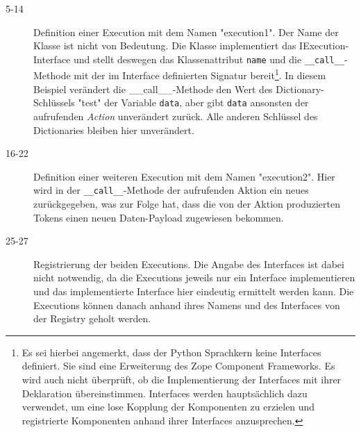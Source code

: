 \begin{description}
\item[5-14] Definition einer Execution mit dem Namen "execution1". Der Name der Klasse ist nicht von Bedeutung. Die Klasse implementiert das IExecution-Interface und stellt deswegen das Klassenattribut \texttt{name} und die \texttt{\_\_call\_\_}-Methode mit der im Interface definierten Signatur bereit\footnote{Es sei hierbei angemerkt, dass der Python Sprachkern keine Interfaces definiert. Sie sind eine Erweiterung des Zope Component Frameworks. Es wird auch nicht überprüft, ob die Implementierung der Interfaces mit ihrer Deklaration übereinstimmen. Interfaces werden hauptsächlich dazu verwendet, um eine lose Kopplung der Komponenten zu erzielen und registrierte Komponenten anhand ihrer Interfaces anzusprechen.}. In diesem Beispiel verändert die {\_\_call\_\_}-Methode den Wert des Dictionary-Schlüssels "test" der Variable \texttt{data}, aber gibt \texttt{data} ansonsten der aufrufenden \emph{Action} unverändert zurück. Alle anderen Schlüssel des Dictionaries bleiben hier unverändert.
\item[16-22] Definition einer weiteren Execution mit dem Namen "execution2". Hier wird in der \texttt{\_\_call\_\_}-Methode der aufrufenden Aktion ein neues  zurückgegeben, was zur Folge hat, dass die von der Aktion produzierten Tokens einen neuen Daten-Payload zugewiesen bekommen.
\item[25-27] Registrierung der beiden Executions. Die Angabe des Interfaces ist dabei nicht notwendig, da die Executions jeweils nur ein Interface implementieren und das implementierte Interface hier eindeutig ermittelt werden kann. Die Executions können danach anhand ihres Namens und des Interfaces von der Registry geholt werden.
\end{description}


